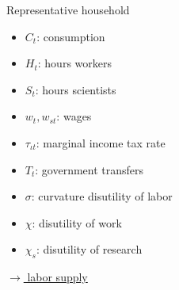 \documentclass[11pt,aspectratio=169]{beamer}
\begin{document}
\begin{frame}{Representative household}
\small
\vspace{4mm}
\hspace{-8mm}
\begin{minipage}[t!]{0.26\textwidth}
	\vspace{7mm}
	\begin{itemize}
		\item[] $C_{t}$: consumption\vspace{-2mm}
		\item[] $H_{t}$: hours workers\vspace{-2mm}
		\item[] $S_{t}$: hours scientists\vspace{-2mm}
	\end{itemize}
\end{minipage}
\begin{minipage}[t!]{0.37\textwidth}
	\vspace{8mm}
	\begin{itemize}
		\item[] $w_{t}, w_{st}$: wages  \vspace{-2mm}
		\item[] $\tau_{\iota t}$: marginal income tax rate 
		\vspace{-2mm}	
		\item[] $T_{t}$: government transfers
	\end{itemize}
\end{minipage}
\begin{minipage}[t!]{0.39\textwidth}
	\vspace{8mm}
	\begin{itemize}
		\item[] $\sigma$: curvature disutility of labor  \vspace{-2mm}
		\item[] $\chi$: disutility of work
		\vspace{-2mm}	
		\item[] $\chi_s$: disutility of research
	\end{itemize}
\end{minipage}

\vspace{12mm}
\hfill	\hyperlink{labsup}{\tiny{$\rightarrow$ labor supply}}
\hypertarget{hhopt}{}
\end{frame}
\end{document}
